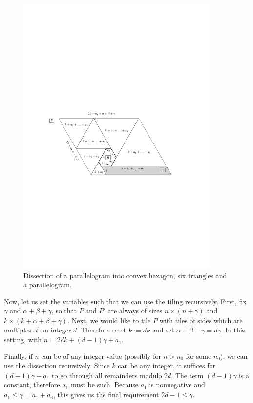 \begin{figure}[htb]
\centering
\includegraphics[width=0.9\textwidth]{img/core_tiling1.pdf}
\caption{Dissection of a parallelogram into convex hexagon, six triangles and a parallelogram.}
\label{fig:core-tiling1}
\end{figure}

Now, let us set the variables such that we can use the tiling recursively. First, fix $\gamma$ and $\alpha+\beta+\gamma$, so that $P$ and $P'$ are always of sizes $n \times (n+\gamma)$ and $k \times (k+\alpha+\beta+\gamma)$. Next, we would like to tile $P$ with tiles of sides which are multiples of an integer $d$. Therefore reset $k := dk$ and set $\alpha+\beta+\gamma = d\gamma$. In this setting,
with $n = 2dk + (d-1)\gamma + a_1$.

Finally, if $n$ can be of any integer value (possibly for $n > n_0$ for some $n_0$), we can use the dissection recursively. Since $k$ can be any integer, it suffices for $(d-1)\gamma + a_1$ to go through all remainders modulo $2d$. The term $(d-1)\gamma$ is a constant, therefore $a_1$ must be such. Because $a_1$ is nonnegative and $a_1 \leq \gamma = a_1 + a_6$, this gives us the final requirement $2d-1 \leq \gamma$.


